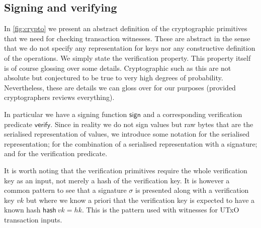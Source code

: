 \documentclass[11pt,a4paper]{article}
\newcommand{\var}[1]{\mathit{#1}}
\newcommand{\fun}[1]{\mathsf{#1}}
\begin{document}
\subsection{Signing and verifying}

In \cref{fig:crypto} we present an abstract definition of the cryptographic
primitives that we need for checking transaction witnesses. These are abstract
in the sense that we do not specify any representation for keys nor any
constructive definition of the operations. We simply state the verification
property. This property itself is of course glossing over some details.
Cryptographic such as this are not absolute but conjectured to be true to
very high degrees of probability. Nevertheless, these are details we can gloss
over for our purposes (provided cryptographers reviews everything).

In particular we have a signing function $\fun{sign}$ and a corresponding
verification predicate $\fun{verify}$. Since in reality we do not sign values
but raw bytes that are the serialised representation of values, we introduce
some notation for the serialised representation; for the combination of a
serialised representation with a signature; and for the verification predicate.

It is worth noting that the verification primitives require the whole
verification key as an input, not merely a hash of the verification key. It is
however a common pattern to see that a signature $\sigma$ is presented along
with a verification key $\var{vk}$ but where we know a priori that the
verification key is expected to have a known hash $\fun{hash}~\var{vk} = \var{hk}$.
This is the pattern used with witnesses for UTxO transaction inputs.
\end{document}
